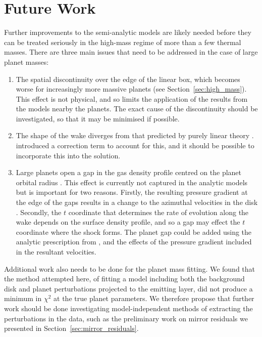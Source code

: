 \section{Future Work}

Further improvements to the semi-analytic models are likely needed before they can be treated seriously in the high-mass regime of more than a few thermal masses.
There are three main issues that need to be addressed in the case of large planet masses:
\begin{enumerate}
    \item The spatial discontinuity over the edge of the linear box, which becomes worse for increasingly more massive planets (see Section~\ref{sec:high_mass}). This effect is not physical, and so limits the application of the results from the models nearby the planets. The exact cause of the discontinuity should be investigated, so that it may be minimised if possible.
    \item The shape of the wake diverges from that predicted by purely linear theory \citep{ogilvie2002}. \citet{cimerman2021} introduced a correction term to account for this, and it should be possible to incorporate this into the solution.
    \item Large planets open a gap in the gas density profile centred on the planet orbital radius \citep[e.g.][]{ward1997}. This effect is currently not captured in the analytic models but is important for two reasons. Firstly, the resulting pressure gradient at the edge of the gaps results in a change to the azimuthal velocities in the disk \citep{teague2018}. Secondly, the $t$ coordinate that determines the rate of evolution along the wake depends on the surface density profile, and so a gap may effect the $t$ coordinate where the shock forms. The planet gap could be added using the analytic prescription from \citet{kanagawa2015}, and the effects of the pressure gradient included in the resultant velocities.
\end{enumerate}

Additional work also needs to be done for the planet mass fitting.
We found that the method attempted here, of fitting a model including both the background disk and planet perturbations projected to the emitting layer, did not produce a minimum in $\chi^2$ at the true planet parameters.
We therefore propose that further work should be done investigating model-independent methods of extracting the perturbations in the data, such as the preliminary work on mirror residuals we presented in Section~\ref{sec:mirror_residuals}.

